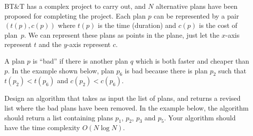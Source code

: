 BT\&T  has a complex project to carry out, and $N$ alternative plans
have been proposed for completing the project.  Each plan $p$ can be
represented by a pair $(t(p),c(p))$ where $t(p)$ is the time (duration)
and $c(p)$ is the cost of plan~$p$.  We can represent these plans as
points in the plane, just let the $x$-axis represent $t$ and the
$y$-axis represent $c$.

A plan $p$ is ``bad'' if there is another plan $q$ which is both faster
and cheaper than $p$.  In the example shown below, plan $p_6$ is bad
because there is plan $p_2$ such that $t(p_2) < t(p_6)$ and $c(p_2) <
c(p_6)$.

Design an algorithm that takes as input the list of plans, and returns
a revised list where the bad plans have been removed.  In the example
below, the algorithm should return a list containing plans $p_1$,
$p_2$, $p_3$ and $p_5$. Your algorithm should have the time complexity
$O(N \log  N)$.
 

\vspace{4mm}
\par
\begin{figure}[h]
\centerline{}\end{figure}

\par
\vspace{4mm}
